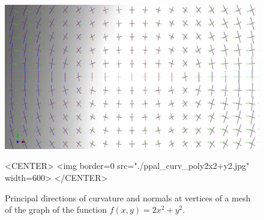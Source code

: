 

\begin{figure}[!ht]
\begin{ccTexOnly}
\centerline{
\includegraphics[width=.5\linewidth]{Jet_fitting_3/ppal_curv_poly2x2+y2}}
\end{ccTexOnly}

\begin{ccHtmlOnly}
<CENTER> <img border=0 src="./ppal_curv_poly2x2+y2.jpg" width=600>
</CENTER>
\end{ccHtmlOnly}
\caption{Principal directions of curvature and normals at vertices of a mesh of the
 graph of the function $f(x,y)=2x^2+y^2$.}
\label{fig:jet3:fig-elliptic-paraboloid}
\end{figure}
  
